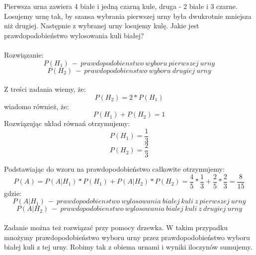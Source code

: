 \medskip
{} 
\medskip

Pierwsza urna zawiera 4 białe i jedną czarną kule, druga - 2 białe i 3 czarne.
Losujemy urnę tak, by szansa wybrania pierwszej urny była dwukrotnie mniejsza
niż drugiej. Następnie z wybranej urny losujemy kulę. Jakie jest prawdopodobieństwo
wylosowania kuli białej?\\ 
\\

Rozwiązanie:
$$
P(H_1) \ - \ prawdopodobienstwo \ wyboru \ pierwszej \ urny
$$
$$
P(H_2) \ - \ prawdopodobienstwo \ wyboru \ drugiej \ urny
$$
\\
Z treści zadania wiemy, że:
$$
 P(H_2) = 2* P(H_1)
$$
wiadomo również, że:
$$
 P(H_1) + P(H_2) =1
$$
Rozwiązując układ równań otrzymujemy:
$$
P(H_1) = \frac{1}{3}
$$
$$
P(H_2) = \frac{2}{3}
$$

Podstawiając do wzoru na prawdopodobieństwo całkowite otrzymujemy:
$$
P(A) = P(A|H_1)*P(H_1) + P(A|H_2)*P(H_2) = \frac{4}{5} * \frac{1}{3} + \frac{2}{5} * \frac{2}{3} = \frac{8}{15}
$$
gdzie:
$$
P(A|H_1) \ - \ prawdopodobienstwo \ wylosowania \ bialej \ kuli \ z \ pierwszej \ urny 
$$
$$
P(A|H_2) \ - \ prawdopodobienstwo \ wylosowania \ bialej \ kuli \ z \ drugiej \ urny 
$$
\\


Zadanie można też rozwiązać przy pomocy drzewka. W takim przypadku mnożymy
prawdopodobieństwo wyboru urny przez prawdopodobieństwo wyboru białej kuli z
tej urny. Robimy tak z obiema urnami i wyniki iloczynów sumujemy.

\begin{comment}
$$
\Tree [.Wybor\ urny [.I\\\ urna\\\ $\frac{1}{3}$ [.biała\ $\frac{4}{5}$ ] [.czarna\ $\frac{1}{5}$ ] ]
	 [.II\\\ urna\\\ $\frac{2}{3}$ [.biała\ $\frac{2}{5}$ ]
		 [.czarna\ $\frac{3}{5}$ 
			  ] ] ]
$$
\end{comment}
